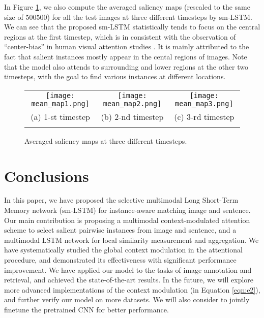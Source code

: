 \documentclass[10pt,twocolumn,letterpaper]{article}
\begin{document}
In Figure \ref{figure:mean}, we also compute the averaged saliency maps
(rescaled to the same size of 500500) for all the test images
at three different timesteps by sm-LSTM.
We can see that the proposed sm-LSTM statistically tends to focus on
the central regions at the first timestep,
which is in consistent with the observation of ``center-bias'' in
human visual attention studies \cite{tseng2009quantifying,bindemann2010scene}.
It is mainly attributed to the fact that salient instances mostly
appear in the cental regions of images.
Note that the model also attends to surrounding and lower regions
at the other two timesteps, with the goal to find various instances at different locations.





\begin{figure}[t]
\addtolength{\tabcolsep}{-2pt}
\centering
\begin{tabular}{ccc}
\texttt{[image: mean\_map1.png]} \hspace{2mm}&\hspace{2mm}
\texttt{[image: mean\_map2.png]} \hspace{2mm}&\hspace{2mm}
\texttt{[image: mean\_map3.png]}\\
(a) 1-st timestep  &  (b) 2-nd timestep &  (c) 3-rd timestep\\
\\
\end{tabular}
\caption{Averaged saliency maps at three different timesteps.}
\label{figure:mean}
\end{figure}


\section{Conclusions}
In this paper, we have proposed the selective multimodal Long Short-Term Memory network (sm-LSTM)
for instance-aware matching image and sentence. Our main contribution is proposing a
multimodal context-modulated attention scheme to select salient pairwise instances
from image and sentence, and a multimodal LSTM network for local similarity measurement and aggregation.
We have systematically studied the global context modulation in
the attentional procedure, and demonstrated its effectiveness with significant performance
improvement.
We have applied our model to the tasks of image annotation and retrieval,
and achieved the state-of-the-art results.
In the future, we will explore more advanced implementations of the context modulation
(in Equation \ref{eqn:e2}), and
further verify our model on more datasets.
We will also consider to jointly finetune the pretrained CNN
for better performance.





{\small


}
\end{document}
